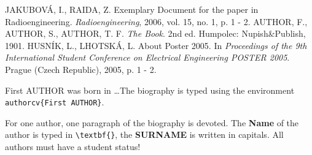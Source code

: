 \documentclass{poster16}
\begin{document}
\begin{thebibliography}{9}
JAKUBOV\'A, I., RAIDA, Z. Exemplary Document for the paper in Radioengineering. \emph{Radioengineering}, 2006, vol. 15, no. 1, p. 1 - 2.
AUTHOR, F., AUTHOR, S., AUTHOR, T. F. \emph{The Book}. 2nd ed. Humpolec: Nupish\&Publish, 1901.
HUSN\'IK, L., LHOTSK\'A, L. About Poster 2005. In \emph{Proceedings of the 9th International Student Conference on Electrical Engineering POSTER 2005}. Prague (Czech Republic), 2005, p. 1 - 2.
\end{thebibliography}


\begin{authorcv}{First AUTHOR}
was born in \dots The biography is typed using the environment \verb+authorcv{First AUTHOR}+. 

For one author, one paragraph of the biography is devoted. The \textbf{Name} of the author is typed in  \verb+\textbf{}+, the \textbf{SURNAME} is written in capitals.  All authors must have a student status!
\end{authorcv}
\end{document}
